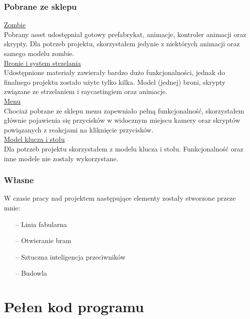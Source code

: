 \documentclass[12pt,a4paper]{article}
\newcommand{\si}{ś}
\begin{document}
		\subsubsection*{Pobrane ze sklepu} 
		\underline{Zombie} \\		
		Pobrany asset udostępniał gotowy prefabrykat, animacje, kontroler animacji oraz skrypty. Dla potrzeb projektu, skorzystałem jedynie z niektórych animacji oraz samego modelu zombie.\\
		
		\noindent \underline{Bronie i system strzelania} \\		
		Udostępnione materiały zawierały bardzo dużo funkcjonalno\si ci, jednak do finalnego projektu zostało użyte tylko kilka. Model (jednej) broni, skrypty związane ze strzelaniem i raycastingiem oraz animacje. \\
		
		\noindent \underline{Menu} \\		
		Chociaż pobrane ze sklepu menu zapewniało pełną funkcjonalno\si ć, skorzystałem głównie pojawienia się przycisków w widocznym miejscu kamery oraz skryptów powiązanych z reakcjami na kliknięcie przycisków. \\
		
		\noindent \underline{Model klucza i stołu} \\
		Dla potrzeb projektu skorzystałem z modelu klucza i stołu. Funkcjonalno\si ć oraz inne modele nie zostały wykorzystane.
		
		\noindent \subsubsection*{Własne} 
		W czasie pracy nad projektem następujące elementy zostały stworzone przeze mnie:
		\begin{itemize}
		\item[--] Linia fabularna

		\item[--] Otwieranie bram
		\item[--] Sztuczna inteligencja przeciwników
		\item[--] Budowla

		\end{itemize}

	\section*{Pełen kod programu}
	
\end{document}
